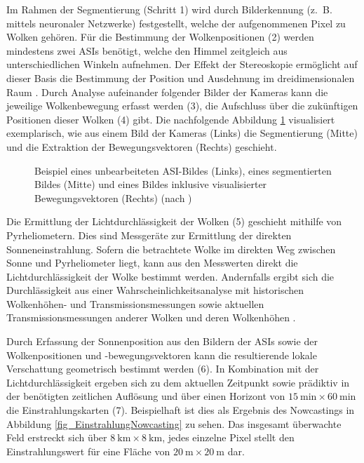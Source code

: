 Im Rahmen der Segmentierung (Schritt 1) wird durch Bilderkennung (z.~B. mittels neuronaler Netzwerke) festgestellt, welche der aufgenommenen Pixel zu Wolken gehören.
Für die Bestimmung der Wolkenpositionen (2) werden mindestens zwei ASIs benötigt, welche den Himmel zeitgleich aus unterschiedlichen Winkeln aufnehmen.
Der Effekt der Stereoskopie ermöglicht auf dieser Basis die Bestimmung der Position und Ausdehnung im dreidimensionalen Raum \cite[S.5]{Samu}.
Durch Analyse aufeinander folgender Bilder der Kameras kann die jeweilige Wolkenbewegung erfasst werden (3), die Aufschluss über die zukünftigen Positionen dieser Wolken (4) gibt.
Die nachfolgende Abbildung \ref{fig_Nowcasting} visualisiert exemplarisch, wie aus einem Bild der Kameras (Links) die Segmentierung (Mitte) und die Extraktion der Bewegungsvektoren (Rechts) geschieht.

\begin{figure}[h!]
\centering
\setlength{\fboxsep}{1pt}
\setlength{\fboxrule}{1pt}
\caption[Beispiel eines unbearbeiteten ASI-Bildes, eines segmentierten Bildes und eines Bildes inklusive visualisierter Bewegungsvektoren]{Beispiel eines unbearbeiteten ASI-Bildes (Links), eines segmentierten Bildes (Mitte) und eines Bildes inklusive visualisierter Bewegungsvektoren (Rechts) (nach \cite[S.8]{Sayeef})}
\label{fig_Nowcasting}
\end{figure}

Die Ermittlung der Lichtdurchlässigkeit der Wolken (5) geschieht mithilfe von Pyrheliometern.
Dies sind Messgeräte zur Ermittlung der direkten Sonneneinstrahlung.
Sofern die betrachtete Wolke im direkten Weg zwischen Sonne und Pyrheliometer liegt, kann aus den Messwerten direkt die Lichtdurchlässigkeit der Wolke bestimmt werden.
Andernfalls ergibt sich die Durchlässigkeit aus einer Wahrscheinlichkeitsanalyse mit historischen Wolkenhöhen- und Transmissionsmessungen sowie aktuellen Transmissionsmessungen anderer Wolken und deren Wolkenhöhen \cite{BijanNowcasting}.

Durch Erfassung der Sonnenposition aus den Bildern der ASIs sowie der Wolkenpositionen und -bewegungsvektoren kann die resultierende lokale Verschattung geometrisch bestimmt werden (6).
In Kombination mit der Lichtdurchlässigkeit ergeben sich zu dem aktuellen Zeitpunkt sowie prädiktiv in der benötigten zeitlichen Auflösung und über einen Horizont von $\SI{15}{\minute} \times \SI{60}{\minute}$ die Einstrahlungskarten (7).
Beispielhaft ist dies als Ergebnis des Nowcastings in Abbildung \ref{fig_EinstrahlungNowcasting} zu sehen.
Das insgesamt überwachte Feld erstreckt sich über $\SI{8}{\kilo\metre} \times \SI{8}{\kilo\metre}$, jedes einzelne Pixel stellt den Einstrahlungswert für eine Fläche von $\SI{20}{\metre} \times \SI{20}{\metre}$ dar.

